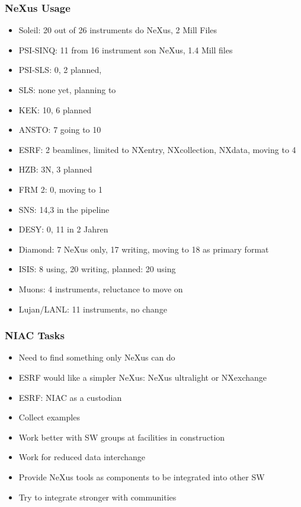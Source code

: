 \documentclass{beamer}
\begin{document}
\begin{frame}
\frametitle{NeXus Usage}
\begin{itemize}
\item Soleil: 20 out of 26 instruments do NeXus, 2 Mill Files
\item PSI-SINQ: 11 from 16 instrument son NeXus, 1.4 Mill files
\item PSI-SLS: 0, 2 planned, 
\item SLS: none yet, planning to 
\item KEK: 10, 6 planned
\item ANSTO: 7 going to 10
\item ESRF: 2 beamlines, limited to NXentry, NXcollection, NXdata, moving to 4
\item HZB: 3N, 3 planned 
\item FRM 2: 0, moving to 1
\item SNS: 14,3 in the pipeline
\item DESY: 0, 11 in 2 Jahren
\item Diamond: 7 NeXus only, 17 writing, moving to 18 as primary format
\item ISIS: 8 using, 20 writing, planned: 20 using
\item Muons: 4 instruments, reluctance to move on
\item Lujan/LANL: 11 instruments, no change
\end{itemize}
\end{frame}

\begin{frame}
\frametitle{NIAC Tasks}
\begin{itemize}
\item Need to find something only NeXus can do
\item ESRF would like a simpler NeXus: NeXus ultralight or NXexchange
\item ESRF: NIAC as a custodian
\item Collect examples
\item Work better with SW groups at facilities in construction
\item Work for reduced data interchange
\item Provide NeXus tools as components to be integrated into other SW
\item Try to integrate stronger with communities
\end{itemize}
\end{frame}
\end{document}
